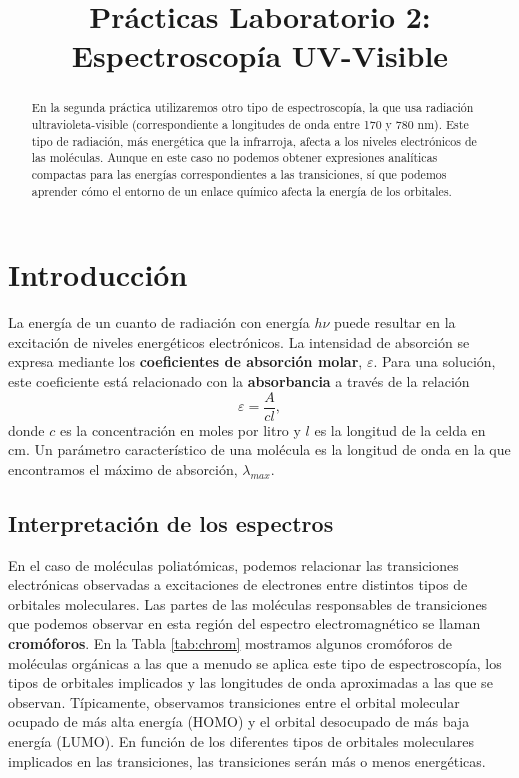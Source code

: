 \documentclass{tufte-handout}
\title[Prácticas Química Física II: UV-Vis]{
Prácticas Laboratorio 2: Espectroscopía UV-Visible}
\date{}  %
\begin{document}
\maketitle%

\begin{abstract}
En la segunda práctica utilizaremos otro tipo de espectroscopía,
la que usa radiación ultravioleta-visible (correspondiente a 
longitudes de onda entre 170 y 780 nm). Este tipo de radiación,
más energética que la infrarroja, afecta a los niveles electrónicos 
de las moléculas. Aunque en este caso no podemos obtener expresiones
analíticas compactas para las energías correspondientes a las transiciones, sí que podemos aprender cómo el entorno de un enlace
químico afecta la energía de los orbitales. 
\end{abstract}

\section{Introducción}
La energía de un cuanto de radiación con energía $h\nu$ puede
resultar en la excitación de niveles energéticos electrónicos.
La intensidad de absorción se expresa mediante los 
\textbf{coeficientes de absorción molar}, $\varepsilon$. 
Para una solución, este coeficiente está relacionado con la 
\textbf{absorbancia} a través de la relación
\begin{equation}
    \varepsilon = \frac{A}{cl},
\end{equation}
donde $c$ es la concentración en moles por litro y $l$ es la
longitud de la celda en cm. 
Un parámetro característico de una 
molécula es la longitud de onda en la que encontramos
el máximo de absorción, $\lambda_{max}$.

\subsection{Interpretación de los espectros}
En el caso de moléculas poliatómicas, podemos relacionar 
las transiciones electrónicas observadas a excitaciones de
electrones entre distintos tipos de orbitales moleculares.
Las partes de las moléculas responsables de transiciones 
que podemos observar en esta región del espectro 
electromagnético se llaman \textbf{cromóforos}. En la Tabla 
\ref{tab:chrom} mostramos algunos cromóforos de moléculas
orgánicas a las que a menudo se aplica este tipo de
espectroscopía, los tipos de orbitales implicados y 
las longitudes de onda aproximadas a las que se observan. 
Típicamente, observamos transiciones entre el orbital molecular
ocupado de más alta energía (HOMO) y el orbital desocupado de más
baja energía (LUMO). En función de los diferentes tipos de orbitales
moleculares implicados en las transiciones, las transiciones
serán más o menos energéticas. 
\end{document}

